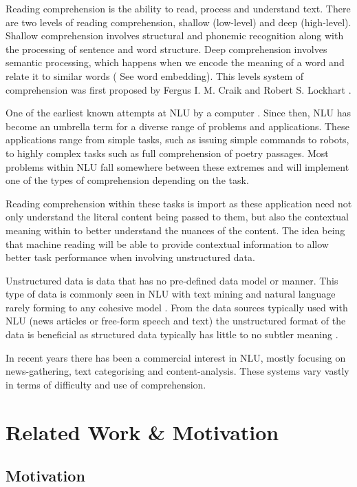 \documentclass[bsc,frontabs,twoside,singlespacing,parskip,deptreport]{infthesis}     %
\begin{document}
Reading comprehension is the ability to read, process and understand text.  
There are two levels of reading comprehension, shallow (low-level) and deep (high-level).
Shallow comprehension involves structural and phonemic recognition along with the processing of sentence and  word
structure.
Deep comprehension involves semantic processing, which happens when we encode the meaning of a word and relate it
to similar words ( See word embedding).
This levels system of comprehension was first proposed by  Fergus I. M. Craik and Robert S. Lockhart \cite{wagner2009beyond}.

One of the earliest known attempts at NLU by a computer \cite{russell1995modern}. Since then, NLU has become an
umbrella term for a diverse range of problems and applications. These applications range from simple tasks, such as
issuing simple commands to robots, to highly complex tasks such as full comprehension of poetry passages.
Most problems within NLU fall somewhere between these extremes and will implement one of the types of comprehension
depending on the task.

Reading comprehension within these tasks is import as these application need not only understand the literal content
being passed to them, but also the contextual meaning within to better understand the nuances of the content.
The idea being that machine reading will be able to provide contextual information to allow better task performance when
involving unstructured data.

Unstructured data is data that has no pre-defined data model or manner. This type of data is
commonly seen in NLU with text mining and natural language rarely forming to any cohesive model \cite{feldman2007text}.
From the data sources typically used with NLU (news articles or free-form speech and text) the unstructured format of
the data is beneficial as structured data typically has little to no subtler meaning \cite{}.

In recent years there has been a commercial interest in NLU, mostly focusing on news-gathering, text categorising and
content-analysis. These systems vary vastly in terms of difficulty and use of comprehension. 

\chapter{Related Work \& Motivation}
\section{Motivation}
\end{document}
